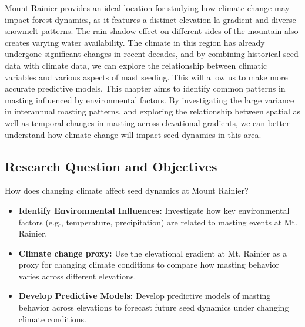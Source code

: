 \documentclass[11pt,letter]{article}
\begin{document}
Mount Rainier provides an ideal location for studying how climate change may impact forest dynamics, as it features a distinct elevation la gradient and diverse snowmelt patterns. The rain shadow effect on different sides of the mountain also creates varying water availability. The climate in this region has already undergone significant changes in recent decades, and by combining historical seed data with climate data, we can explore the relationship between climatic variables and various aspects of mast seeding. This will allow us to make more accurate predictive models.
This chapter aims to identify common patterns in masting influenced by environmental factors. By investigating the large variance in interannual masting patterns, and exploring the relationship between spatial as well as temporal changes in masting across elevational gradients, we can better understand how climate change will impact seed dynamics in this area.\par
\subsection{Research Question and Objectives}
How does changing climate affect seed dynamics at Mount Rainier?
\begin{itemize}
\item\textbf{Identify Environmental Influences:} Investigate how key environmental factors (e.g., temperature, precipitation) are related to masting events at Mt. Rainier.
\item\textbf{Climate change proxy:} Use the elevational gradient at Mt. Rainier as a proxy for changing climate conditions to compare how masting behavior varies across different elevations.
\item\textbf{Develop Predictive Models:} Develop predictive models of masting behavior across elevations to forecast future seed dynamics under changing climate conditions.
\end{itemize}
\end{document}

